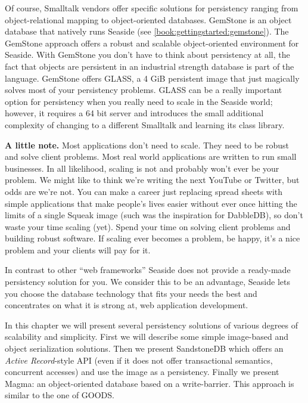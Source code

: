 \documentclass[a4paper,10pt,twoside]{book}
\begin{document}
Of course, Smalltalk vendors offer specific solutions for persistency ranging from object-relational mapping to object-oriented databases. GemStone is an object database that natively runs Seaside (see \autoref{book:gettingstarted:gemstone}). The GemStone approach offers a robust and scalable object-oriented environment for Seaside. With GemStone you don't have to think about persistency at all, the fact that objects are persistent in an industrial strength database is part of the language. GemStone offers GLASS, a 4 GiB persistent image that just magically solves most of your persistency problems. GLASS can be a really important option for persistency when you really need to scale in the Seaside world; however, it requires a 64 bit server and introduces the small additional complexity of changing to a different Smalltalk and learning its class library.

\textbf{A little note.} Most applications don't need to scale. They need to be robust and solve client problems. Most real world applications are written to run small businesses. In all likelihood, scaling is not and probably won't ever be your problem. We might like to think we're writing the next YouTube or Twitter, but odds are we're not. You can make a career just replacing spread sheets with simple applications that make people's lives easier without ever once hitting the limits of a single Squeak image (such was the inspiration for DabbleDB), so don't waste your time scaling (yet). Spend your time on solving client problems and building robust software. If scaling ever becomes a problem, be happy, it's a nice problem and your clients will pay for it.

In contrast to other ``web frameworks'' Seaside does not provide a ready-made persistency solution for you. We consider this to be an advantage, Seaside lets you choose the database technology that fits your needs the best and concentrates on what it is strong at, web application development.

In this chapter we will present several persistency solutions of various degrees of scalability and simplicity. First we will describe some simple image-based and object serialization solutions. Then we present SandstoneDB which offers an \textit{Active Record}-style API (even if it does not offer transactional semantics, concurrent accesses) and use the image as a persistency. Finally we present Magma: an object-oriented database based on a write-barrier. This approach is similar to the one of GOODS.

\end{document}
